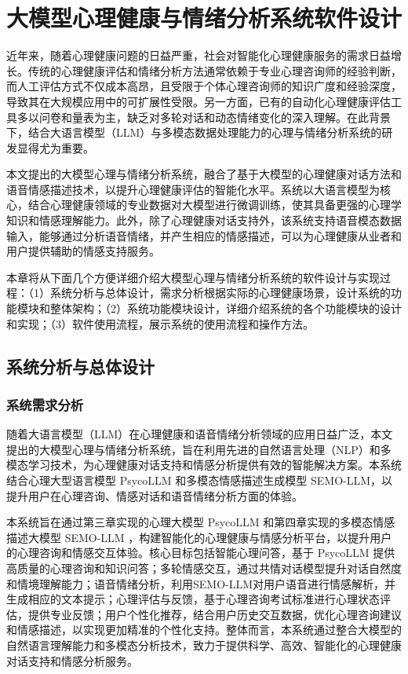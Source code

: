
\chapter{大模型心理健康与情绪分析系统软件设计}

近年来，随着心理健康问题的日益严重，社会对智能化心理健康服务的需求日益增长。传统的心理健康评估和情绪分析方法通常依赖于专业心理咨询师的经验判断，而人工评估方式不仅成本高昂，且受限于个体心理咨询师的知识广度和经验深度，导致其在大规模应用中的可扩展性受限。另一方面，已有的自动化心理健康评估工具多以问卷和量表为主，缺乏对多轮对话和动态情绪变化的深入理解。在此背景下，结合大语言模型（LLM）与多模态数据处理能力的心理与情绪分析系统的研发显得尤为重要。

本文提出的大模型心理与情绪分析系统，融合了基于大模型的心理健康对话方法和语音情感描述技术，以提升心理健康评估的智能化水平。系统以大语言模型为核心，结合心理健康领域的专业数据对大模型进行微调训练，使其具备更强的心理学知识和情感理解能力。此外，除了心理健康对话支持外，该系统支持语音模态数据输入，能够通过分析语音情绪，并产生相应的情感描述，可以为心理健康从业者和用户提供辅助的情感支持服务。

本章将从下面几个方便详细介绍大模型心理与情绪分析系统的软件设计与实现过程：（1）系统分析与总体设计，需求分析根据实际的心理健康场景，设计系统的功能模块和整体架构；（2）系统功能模块设计，详细介绍系统的各个功能模块的设计和实现；（3）软件使用流程，展示系统的使用流程和操作方法。

\section{系统分析与总体设计}

\subsection{系统需求分析}

随着大语言模型（LLM）在心理健康和语音情绪分析领域的应用日益广泛，本文提出的大模型心理与情绪分析系统，旨在利用先进的自然语言处理（NLP）和多模态学习技术，为心理健康对话支持和情感分析提供有效的智能解决方案。本系统结合心理大型语言模型 PsycoLLM 和多模态情感描述生成模型 SEMO-LLM，以提升用户在心理咨询、情感对话和语音情绪分析方面的体验。

本系统旨在通过第三章实现的心理大模型 PsycoLLM 和第四章实现的多模态情感描述大模型 SEMO-LLM ，构建智能化的心理健康与情感分析平台，以提升用户的心理咨询和情感交互体验。核心目标包括智能心理问答，基于 PsycoLLM 提供高质量的心理咨询和知识问答；多轮情感交互，通过共情对话模型提升对话自然度和情境理解能力；语音情绪分析，利用SEMO-LLM对用户语音进行情感解析，并生成相应的文本提示；心理评估与反馈，基于心理咨询考试标准进行心理状态评估，提供专业反馈；用户个性化推荐，结合用户历史交互数据，优化心理咨询建议和情感描述，以实现更加精准的个性化支持。整体而言，本系统通过整合大模型的自然语言理解能力和多模态分析技术，致力于提供科学、高效、智能化的心理健康对话支持和情感分析服务。

